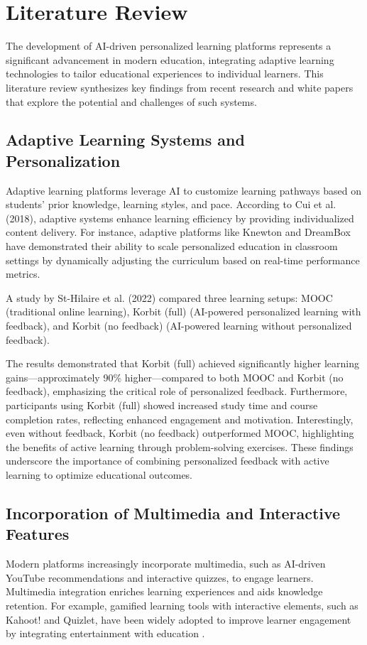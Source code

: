
\chapter{Literature Review} %

\label{Chapter2} %

The development of AI-driven personalized learning platforms represents a significant advancement in modern education, integrating adaptive learning technologies to tailor educational experiences to individual learners. This literature review synthesizes key findings from recent research and white papers that explore the potential and challenges of such systems.

\section{Adaptive Learning Systems and Personalization}
Adaptive learning platforms leverage AI to customize learning pathways based on students' prior knowledge, learning styles, and pace. According to Cui et al. (2018)\cite{arxiv2024}, adaptive systems enhance learning efficiency by providing individualized content delivery. For instance, adaptive platforms like Knewton and DreamBox have demonstrated their ability to scale personalized education in classroom settings by dynamically adjusting the curriculum based on real-time performance metrics.

A study by St-Hilaire et al. (2022)\cite{StHilaire2022ANE} compared three learning setups: MOOC (traditional online learning), Korbit (full) (AI-powered personalized learning with feedback), and Korbit (no feedback) (AI-powered learning without personalized feedback). 

The results demonstrated that Korbit (full) achieved significantly higher learning gains—approximately 90\% higher—compared to both MOOC and Korbit (no feedback), emphasizing the critical role of personalized feedback. Furthermore, participants using Korbit (full) showed increased study time and course completion rates, reflecting enhanced engagement and motivation. Interestingly, even without feedback, Korbit (no feedback) outperformed MOOC, highlighting the benefits of active learning through problem-solving exercises. These findings underscore the importance of combining personalized feedback with active learning to optimize educational outcomes.

\section{Incorporation of Multimedia and Interactive Features}
Modern platforms increasingly incorporate multimedia, such as AI-driven YouTube recommendations and interactive quizzes, to engage learners. Multimedia integration enriches learning experiences and aids knowledge retention. For example, gamified learning tools with interactive elements, such as Kahoot! and Quizlet, have been widely adopted to improve learner engagement by integrating entertainment with education \cite{multimedia2020}.

